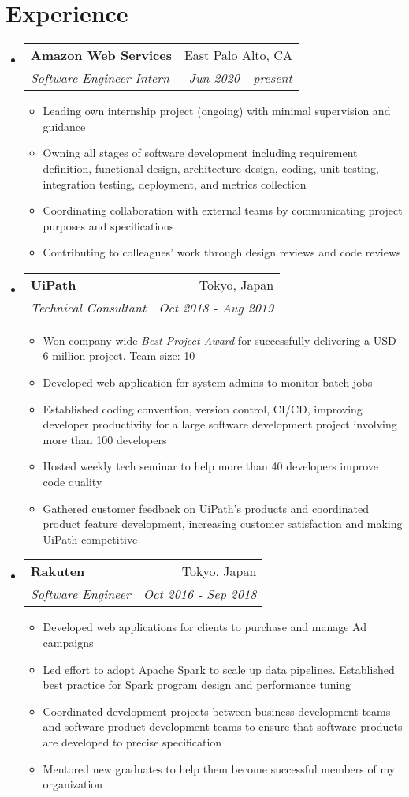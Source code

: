 \documentclass[letterpaper,11pt]{article}
\makeatletter
\newcommand{\bulletItem}[1]{
  \item\small{
    {#1 \vspace{-2pt}}
  }
}
\newcommand{\resumeSubheading}[4]{
  \vspace{-1pt}\item[]
    \begin{tabular*}{0.97\textwidth}[t]{l@{\extracolsep{\fill}}r}
      \textbf{#1} & #2 \\
      \textit{\small#3} & \textit{\small #4} \\
    \end{tabular*}\vspace{-5pt}
}
\newcommand{\resumeSubHeadingListStart}{\begin{itemize}[leftmargin=0pt]}
\newcommand{\resumeSubHeadingListEnd}{\end{itemize}}
\makeatother
\begin{document}
\section{Experience}
  \resumeSubHeadingListStart
    \resumeSubheading
    {Amazon Web Services}{East Palo Alto, CA}
    {Software Engineer Intern}{Jun 2020 - present}
    \begin{itemize} 
      \bulletItem {Leading own internship project (ongoing) with minimal supervision and guidance}
      \bulletItem {Owning all stages of software development including requirement definition, functional design, architecture design, coding, unit testing, integration testing, deployment, and metrics collection}
      \bulletItem {Coordinating collaboration with external teams by communicating project purposes and specifications}
      \bulletItem {Contributing to colleagues' work through design reviews and code reviews}
    \end{itemize}

    \resumeSubheading
      {UiPath}{Tokyo, Japan}
      {Technical Consultant}{Oct 2018 - Aug 2019}
      \begin{itemize} 
        \bulletItem {Won company-wide \textit{Best Project Award} for successfully delivering a USD 6 million project. Team size: 10}
        \bulletItem {Developed web application for system admins to monitor batch jobs}
        \bulletItem {Established coding convention, version control, CI/CD, improving developer productivity for a large software development project involving more than 100 developers}
        \bulletItem {Hosted weekly tech seminar to help more than 40 developers improve code quality}
        \bulletItem {Gathered customer feedback on UiPath's products and coordinated product feature development, increasing customer satisfaction and making UiPath competitive}
      \end{itemize}

    \resumeSubheading
      {Rakuten}{Tokyo, Japan}
      {Software Engineer}{Oct 2016 - Sep 2018}
      \begin{itemize} 
        \bulletItem {Developed web applications for clients to purchase and manage Ad campaigns}
        \bulletItem {Led effort to adopt Apache Spark to scale up data pipelines. Established best practice for Spark program design and performance tuning}
        \bulletItem {Coordinated development projects between business development teams and software product development teams to ensure that software products are developed to precise specification}
        \bulletItem {Mentored new graduates to help them become successful members of my organization}
      \end{itemize}
  \resumeSubHeadingListEnd
\end{document}
